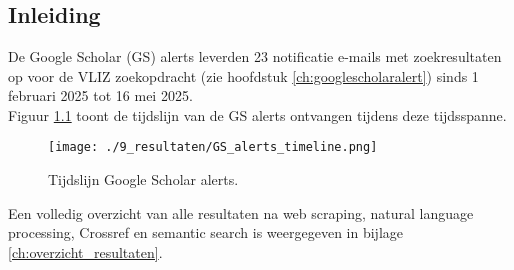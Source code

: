 
\chapter{}%
\label{ch:resultaten}

\section{Inleiding}
De Google Scholar (GS) alerts leverden 23 notificatie e-mails met zoekresultaten op voor de VLIZ zoekopdracht (zie hoofdstuk \ref{ch:googlescholaralert}) sinds 1 februari 2025 tot 16 mei 2025.\\
Figuur \ref{fig:GSAlertsTimeline} toont de tijdslijn van de GS alerts ontvangen tijdens deze tijdsspanne.
\begin{figure}[h!]
    \centering
    \texttt{[image: ./9\_resultaten/GS\_alerts\_timeline.png]}
    \caption[Tijdslijn Google Scholar alerts.]{\label{fig:GSAlertsTimeline}Tijdslijn Google Scholar alerts.}
\end{figure}
Een volledig overzicht van alle resultaten na web scraping, natural language processing, Crossref en semantic search is weergegeven in bijlage \ref{ch:overzicht_resultaten}.

